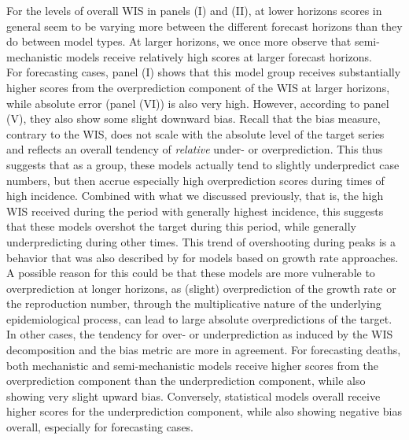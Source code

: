 For the levels of overall WIS in panels (I) and (II), at lower horizons scores in general seem to be varying more between the different forecast horizons than they do between model types. At larger horizons, we once more observe that semi-mechanistic models receive relatively high scores at larger forecast horizons. \\
For forecasting cases, panel (I) shows that this model group receives substantially higher scores from the overprediction component of the WIS at larger horizons, while absolute error (panel (VI)) is also very high. However, according to panel (V), they also show some slight downward bias. Recall that the bias measure, contrary to the WIS, does not scale with the absolute level of the target series and reflects an overall tendency of \textit{relative} under- or overprediction. This thus suggests that as a group, these models actually tend to slightly underpredict case numbers, but then accrue especially high overprediction scores during times of high incidence. Combined with what we discussed previously, that is, the high WIS received during the period with generally highest incidence, this suggests that these models overshot the target during this period, while generally underpredicting during other times. This trend of overshooting during peaks is a behavior that was also described by \cite{bracher_evaluating_2021} for models based on growth rate approaches. A possible reason for this could be that these models are more vulnerable to overprediction at longer horizons, as (slight) overprediction of the growth rate or the reproduction number, through the multiplicative nature of the underlying epidemiological process, can lead to large absolute overpredictions of the target.\\
In other cases, the tendency for over- or underprediction as induced by the WIS decomposition and the bias metric are more in agreement. For forecasting deaths, both mechanistic and semi-mechanistic models receive higher scores from the overprediction component than the underprediction component, while also showing very slight upward bias. Conversely, statistical models overall receive higher scores for the underprediction component, while also showing negative bias overall, especially for forecasting cases. \\
